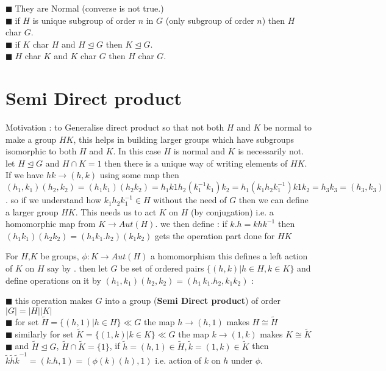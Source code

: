 \documentclass[11pt]{extarticle}
\newcommand{\ra}{\rightarrow}
\newcommand{\y}{$\blacksquare\;$}
\newcommand{\tbx}[2][]{
	\begin{tcolorbox}[enhanced,breakable,size=small,colback=black!2!white,title={#1},arc is angular, arc=1.5mm,drop fuzzy shadow]
		#2
	\end{tcolorbox}
}
\begin{document}
\begin{multicols}{2}
{			\y  They are Normal (converse is not true.) \\
			\y  if $ H $ is unique subgroup of order $ n $ in $ G $ (only subgroup of order $ n $) then $ H $ char $ G. $ \\
			\y  if $ K $ char $H$ and $ H\trianglelefteq G $ then $ K\trianglelefteq G .$ \\
			\y  $ H $ char $ K $  and $ K $ char $ G $ then $ H $ char $ G .$  
	}
	\newcolumn
		\section{Semi Direct product}
	
	\tbx{Motivation :  to Generalise direct product so that not both $ H $ and $ K $ be normal to make a group 
		$ HK $, this helps in building larger groups which have subgroups isomorphic to both $ H $ and $ K $. In this case $ H $ is normal and $ K $ is necessarily not.
		let $ H \trianglelefteq G $ and $ H\cap K=1 $ then there is a unique way of writing elements of $ HK $.
		If we have $ hk \ra (h,k) $ using some map then $ (h_1,k_1)(h_2,k_2)=(h_1k_1)(h_2k_2)=h_1k1h_2 (k_1^{-1}k_1) k_2=h_1(k_1h_2k_1^{-1}) k1k_2= h_3 k_3=(h_3,k_3)$. so if we understand how  $k_1h_2k_1^{-1}  \in H$ without the need of $ G $ then we can define a larger group $ HK $. This needs us to act $ K $ on $ H $ (by conjugation)  
		i.e. a homomorphic map from $ K \ra Aut(H). $ we then define :  if $ k.h= k h k^{-1} $ then $ (h_1k_1)(h_2k_2) 
		= (h_1k_1.h_2)(k_1k_2)$ gets the operation part done for $ HK $
	}
	\tbx{For $  H$,$ K $ be groups, $ \phi :K \ra Aut(H) $ a homomorphism this defines a left action of $ K $ on $ H $ say by $ . $ then let $ G $ be set of ordered pairs $ \{(h,k)|h\in H, k\in K\} $ and define operations on it by 
		$ (h_1,k_1)(h_2,k_2)=(h_1\, k_1.h_2, k_1k_2) $ :
		
		\y  this operation makes $ G $ into a group (\textbf{Semi Direct product}) of order $ |G|=|H||K| $ \\
		\y  for set $ \tilde{H}=\{(h,1)|h\in H\} \ll G$ the map $ h \ra (h,1) $ makes $ H\cong \tilde{H} $  \\
		\y  similarly for set $ \tilde{K}=\{(1,k)|k\in K\} \ll G$ the map $ k \ra (1,k) $ makes $ K\cong \tilde{K} $  \\
		\y  and  $ \tilde{H}\trianglelefteq G$, $ \tilde{H}\cap \tilde{K}= \{1\} $, if $\tilde{h}= (h,1)\in \tilde{H}, \tilde{k}=(1,k)\in \tilde{K} $ then \\
		$ \tilde{k }\tilde{h} \tilde{k}^{-1}=(k.h,1) = (\phi(k)(h),1)$ i.e. action of $ k $ on $ h $ under $ \phi .$
		
}
\end{multicols}
\end{document}
